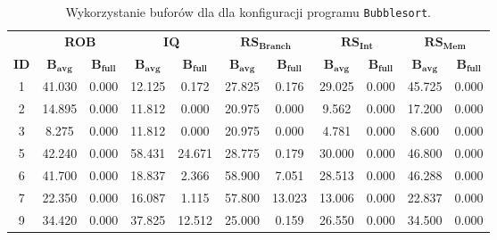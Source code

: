 \begin{table}[]
\centering
\caption{ Wykorzystanie buforów dla dla konfiguracji programu \texttt{Bubblesort}. }
\label{tab:buffers_Bubblesort}
\begin{tabular}{|c|cc|cc|cc|cc|cc|}
\hline& \multicolumn{2}{c|}{\textbf{ROB}} & \multicolumn{2}{c|}{\textbf{IQ}} & \multicolumn{2}{c|}{$\mathbf{RS_{Branch}}$} & \multicolumn{2}{c|}{$\mathbf{RS_{Int}}$} & \multicolumn{2}{c|}{$\mathbf{RS_{Mem}}$} \\ \cline{2-11}
\multirow{-2}{*}{\cellcolor[HTML]{EFEFEF}\textbf{ID}} & $\mathbf{B_{avg}}$ & \cellcolor[HTML]{EFEFEF}$\mathbf{B_{full}}$ & $\mathbf{B_{avg}}$ & \cellcolor[HTML]{EFEFEF}$\mathbf{B_{full}}$ & $\mathbf{B_{avg}}$ & \cellcolor[HTML]{EFEFEF}$\mathbf{B_{full}}$ & $\mathbf{B_{avg}}$ & \cellcolor[HTML]{EFEFEF}$\mathbf{B_{full}}$ & $\mathbf{B_{avg}}$ & \cellcolor[HTML]{EFEFEF}$\mathbf{B_{full}}$ \\ \hline
1 & 41.030 & \cellcolor[HTML]{EFEFEF}0.000 & 12.125 & \cellcolor[HTML]{EFEFEF}0.172 & 27.825 & \cellcolor[HTML]{EFEFEF}0.176 & 29.025 & \cellcolor[HTML]{EFEFEF}0.000 & 45.725 & \cellcolor[HTML]{EFEFEF}0.000 \\ \hline
2 & 14.895 & \cellcolor[HTML]{EFEFEF}0.000 & 11.812 & \cellcolor[HTML]{EFEFEF}0.000 & 20.975 & \cellcolor[HTML]{EFEFEF}0.000 & 9.562 & \cellcolor[HTML]{EFEFEF}0.000 & 17.200 & \cellcolor[HTML]{EFEFEF}0.000 \\ \hline
3 & 8.275 & \cellcolor[HTML]{EFEFEF}0.000 & 11.812 & \cellcolor[HTML]{EFEFEF}0.000 & 20.975 & \cellcolor[HTML]{EFEFEF}0.000 & 4.781 & \cellcolor[HTML]{EFEFEF}0.000 & 8.600 & \cellcolor[HTML]{EFEFEF}0.000 \\ \hline
5 & 42.240 & \cellcolor[HTML]{EFEFEF}0.000 & 58.431 & \cellcolor[HTML]{EFEFEF}24.671 & 28.775 & \cellcolor[HTML]{EFEFEF}0.179 & 30.000 & \cellcolor[HTML]{EFEFEF}0.000 & 46.800 & \cellcolor[HTML]{EFEFEF}0.000 \\ \hline
6 & 41.700 & \cellcolor[HTML]{EFEFEF}0.000 & 18.837 & \cellcolor[HTML]{EFEFEF}2.366 & 58.900 & \cellcolor[HTML]{EFEFEF}7.051 & 28.513 & \cellcolor[HTML]{EFEFEF}0.000 & 46.288 & \cellcolor[HTML]{EFEFEF}0.000 \\ \hline
7 & 22.350 & \cellcolor[HTML]{EFEFEF}0.000 & 16.087 & \cellcolor[HTML]{EFEFEF}1.115 & 57.800 & \cellcolor[HTML]{EFEFEF}13.023 & 13.006 & \cellcolor[HTML]{EFEFEF}0.000 & 22.837 & \cellcolor[HTML]{EFEFEF}0.000 \\ \hline
9 & 34.420 & \cellcolor[HTML]{EFEFEF}0.000 & 37.825 & \cellcolor[HTML]{EFEFEF}12.512 & 25.000 & \cellcolor[HTML]{EFEFEF}0.159 & 26.550 & \cellcolor[HTML]{EFEFEF}0.000 & 34.500 & \cellcolor[HTML]{EFEFEF}0.000 \\ \hline

\end{tabular}
\end{table}
